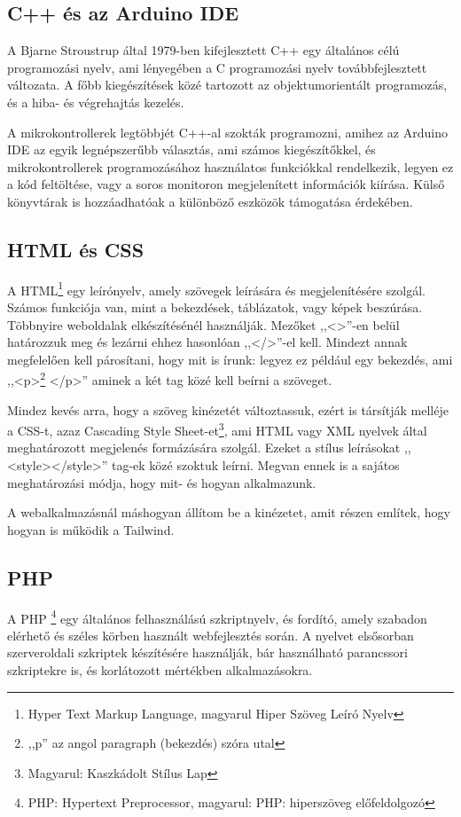 \documentclass[
]{thesis-ekf}
\theoremstyle{definition}
\theoremstyle{remark}
\begin{document}
	\subsection{C++ és az Arduino IDE}
	A Bjarne Stroustrup által 1979-ben kifejlesztett C++ egy általános célú programozási nyelv, ami lényegében a C programozási nyelv továbbfejlesztett változata. A főbb kiegészítések közé tartozott az objektumorientált programozás, és a hiba- és végrehajtás kezelés.\cite{cpp}
	
	A mikrokontrollerek legtöbbjét C++-al szokták programozni, amihez az Arduino IDE az egyik legnépszerűbb választás, ami számos kiegészítőkkel, és mikrokontrollerek programozásához használatos funkciókkal rendelkezik, legyen ez a kód feltöltése, vagy a soros monitoron megjelenített információk kiírása. Külső könyvtárak is hozzáadhatóak a különböző eszközök támogatása érdekében. 
	
	\subsection{HTML és CSS}
	A HTML\footnote{Hyper Text Markup Language, magyarul Hiper Szöveg Leíró Nyelv} egy leírónyelv, amely szövegek leírására és megjelenítésére szolgál. Számos funkciója van, mint a bekezdések, táblázatok, vagy képek beszúrása. Többnyire weboldalak elkészítésénél használják. Mezőket ,,<>''-en belül határozzuk meg és lezárni ehhez hasonlóan ,,</>''-el kell. Mindezt annak megfelelően kell párosítani, hogy mit is írunk: legyez ez például egy bekezdés, ami ,,<p>\footnote{,,p'' az angol paragraph (bekezdés) szóra utal} </p>'' aminek a két tag közé kell beírni a szöveget.
	
	Mindez kevés arra, hogy a szöveg kinézetét változtassuk, ezért is társítják melléje a CSS-t, azaz Cascading Style Sheet-et\footnote{Magyarul: Kaszkádolt Stílus Lap}, ami HTML vagy XML nyelvek által meghatározott megjelenés formázására szolgál. Ezeket a stílus leírásokat ,,<style></style>'' tag-ek közé szoktuk leírni. Megvan ennek is a sajátos meghatározási módja, hogy mit- és hogyan alkalmazunk.
	
	A webalkalmazásnál máshogyan állítom be a kinézetet, amit  részen említek, hogy hogyan is működik a Tailwind.
	
	\subsection{PHP}
	A PHP \footnote{PHP: Hypertext Preprocessor, magyarul: PHP: hiperszöveg előfeldolgozó} egy általános felhasználású szkriptnyelv, és fordító, amely szabadon elérhető és széles körben használt webfejlesztés során. A nyelvet elsősorban szerveroldali szkriptek készítésére használják, bár használható parancssori szkriptekre is, és korlátozott mértékben alkalmazásokra.\cite{php}
	
\end{document}
